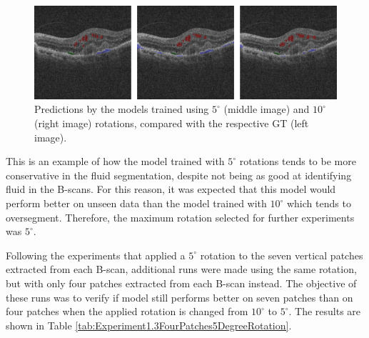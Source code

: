 \begin{figure}[!ht]
	\centering
	\includegraphics[width=1.0\linewidth]{figures/SegmentationsComparisonBetweenDifferentRotations.png}
	\caption{Predictions by the models trained using $5^{\circ}$ (middle image) and $10^{\circ}$ (right image) rotations, compared with the respective GT (left image).}
	\label{fig:SegmentationsComparisonBetweenDifferentRotations}
\end{figure}

This is an example of how the model trained with $5^{\circ}$ rotations tends to be more conservative in the fluid segmentation, despite not being as good at identifying fluid in the B-scans. For this reason, it was expected that this model would perform better on unseen data than the model trained with $10^{\circ}$ which tends to oversegment. Therefore, the maximum rotation selected for further experiments was $5^{\circ}$.
\par
Following the experiments that applied a $5^{\circ}$ rotation to the seven vertical patches extracted from each B-scan, additional runs were made using the same rotation, but with only four patches extracted from each B-scan instead. The objective of these runs was to verify if model still performs better on seven patches than on four patches when the applied rotation is changed from $10^{\circ}$ to $5^{\circ}$. The results are shown in Table \ref{tab:Experiment1.3FourPatches5DegreeRotation}.

